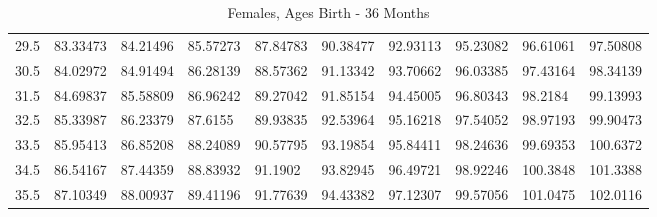 \documentclass[10pt,twocolumn,letterpaper]{article}
\begin{document}
\begin{table}
\begin{tabular}{llllllllll}
    29.5            & 83.33473                               & 84.21496                               & 85.57273                                & 87.84783                                & 90.38477                                & 92.93113                                & 95.23082                                & 96.61061                                & 97.50808                                \\
    30.5            & 84.02972                               & 84.91494                               & 86.28139                                & 88.57362                                & 91.13342                                & 93.70662                                & 96.03385                                & 97.43164                                & 98.34139                                \\
    31.5            & 84.69837                               & 85.58809                               & 86.96242                                & 89.27042                                & 91.85154                                & 94.45005                                & 96.80343                                & 98.2184                                 & 99.13993                                \\
    32.5            & 85.33987                               & 86.23379                               & 87.6155                                 & 89.93835                                & 92.53964                                & 95.16218                                & 97.54052                                & 98.97193                                & 99.90473                                \\
    33.5            & 85.95413                               & 86.85208                               & 88.24089                                & 90.57795                                & 93.19854                                & 95.84411                                & 98.24636                                & 99.69353                                & 100.6372                                \\
    34.5            & 86.54167                               & 87.44359                               & 88.83932                                & 91.1902                                 & 93.82945                                & 96.49721                                & 98.92246                                & 100.3848                                & 101.3388                                \\
    35.5            & 87.10349                               & 88.00937                               & 89.41196                                & 91.77639                                & 94.43382                                & 97.12307                                & 99.57056                                & 101.0475                                & 102.0116                                \\
    \end{tabular}
    \caption {Females, Ages Birth - 36 Months}
\end{table}

\twocolumns
\nocite{*}
{\small


}
\end{document}
